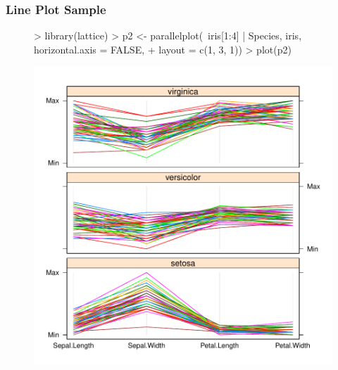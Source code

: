 \documentclass{beamer}
\begin{document}
\begin{frame}[containsverbatim]  
	\frametitle{Line Plot Sample}
\scriptsize
\begin{figure}
  \centering
\begin{Schunk}
\begin{Sinput}
> library(lattice)
> p2 <- parallelplot(~iris[1:4] | Species, iris, horizontal.axis = FALSE, 
+               layout = c(1, 3, 1))  
> plot(p2)
\end{Sinput}
\end{Schunk}
\includegraphics{fig--030}
\label{fig:p2}
\end{figure}
\end{frame}
\end{document}
